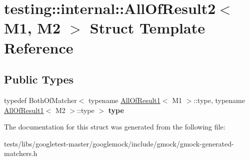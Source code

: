 \hypertarget{structtesting_1_1internal_1_1AllOfResult2}{}\section{testing\+:\+:internal\+:\+:All\+Of\+Result2$<$ M1, M2 $>$ Struct Template Reference}
\label{structtesting_1_1internal_1_1AllOfResult2}
\subsection*{Public Types}
\begin{DoxyCompactItemize}
\item 
\mbox{\label{structtesting_1_1internal_1_1AllOfResult2_adec0b0ce2fdd07d398e1fdd2cdb88392}} 
typedef Both\+Of\+Matcher$<$ typename \hyperlink{structtesting_1_1internal_1_1AllOfResult1}{All\+Of\+Result1}$<$ M1 $>$\+::type, typename \hyperlink{structtesting_1_1internal_1_1AllOfResult1}{All\+Of\+Result1}$<$ M2 $>$\+::type $>$ {\bfseries type}
\end{DoxyCompactItemize}


The documentation for this struct was generated from the following file\+:\begin{DoxyCompactItemize}
\item 
tests/libs/googletest-\/master/googlemock/include/gmock/gmock-\/generated-\/matchers.\+h\end{DoxyCompactItemize}
